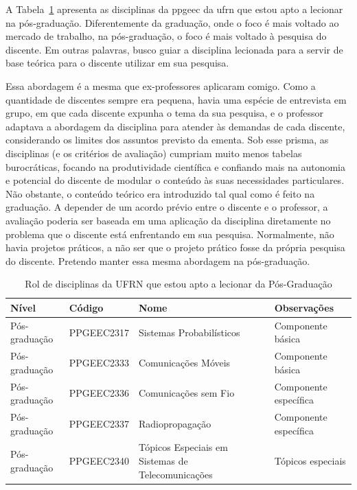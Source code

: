 \documentclass{article}
\begin{document}
A Tabela~\ref{tab:disciplinas-uern-pos} apresenta as disciplinas da \gls{ppgeec} da \gls{ufrn} que estou apto a lecionar na pós-graduação. Diferentemente da graduação, onde o foco é mais voltado ao mercado de trabalho, na pós-graduação, o foco é mais voltado à pesquisa do discente. Em outras palavras, busco guiar a disciplina lecionada para a servir de base teórica para o discente utilizar em sua pesquisa.

Essa abordagem é a mesma que ex-professores aplicaram comigo. Como a quantidade de discentes sempre era pequena, havia uma espécie de entrevista em grupo, em que cada discente expunha o tema da sua pesquisa, e o professor adaptava a abordagem da disciplina para atender às demandas de cada discente, considerando os limites dos assuntos previsto da ementa. Sob esse prisma, as disciplinas (e os critérios de avaliação) cumpriam muito menos tabelas burocráticas, focando na produtividade científica e confiando mais na autonomia e potencial do discente de modular o conteúdo às suas necessidades particulares. Não obstante, o conteúdo teórico era introduzido tal qual como é feito na graduação. A depender de um acordo prévio entre o discente e o professor, a avaliação poderia ser baseada em uma aplicação da disciplina diretamente no problema que o discente está enfrentando em sua pesquisa. Normalmente, não havia projetos práticos, a não ser que o projeto prático fosse da própria pesquisa do discente. Pretendo manter essa mesma abordagem na pós-graduação.

\begin{table}[H]
  \centering
  \caption{Rol de disciplinas da UFRN que estou apto a lecionar da Pós-Graduação}
  \label{tab:disciplinas-uern-pos}
  \begin{tabular}{|p{}|p{}|p{}|p{}|}
    \hline
    \textbf{Nível} & \textbf{Código} & \textbf{Nome} & \textbf{Observações} \\
    \hline
    Pós-graduação & PPGEEC2317 & Sistemas Probabilísticos & Componente básica \\
    \hline
    Pós-graduação & PPGEEC2333 & Comunicações Móveis & Componente básica \\
    \hline
    Pós-graduação & PPGEEC2336 & Comunicações sem Fio & Componente específica \\
    \hline
    Pós-graduação & PPGEEC2337 & Radiopropagação & Componente específica \\
    \hline
    Pós-graduação & PPGEEC2340 & Tópicos Especiais em Sistemas de Telecomunicações & Tópicos especiais \\
    \hline
  \end{tabular}
\end{table}
\end{document}
